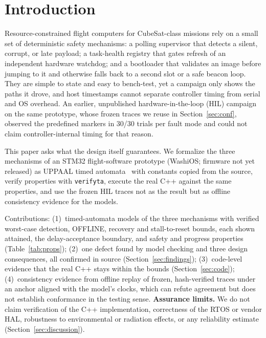 \documentclass[conference,a4paper]{IEEEtran}
\newif\ifanon
\begin{document}
\section{Introduction}
Resource-constrained flight computers for CubeSat-class missions rely on a small set of deterministic safety mechanisms: a polling supervisor that detects a silent, corrupt, or late payload; a task-health registry that gates refresh of an independent hardware watchdog; and a bootloader that validates an image before jumping to it and otherwise falls back to a second slot or a safe beacon loop. They are simple to state and easy to bench-test, yet a campaign only shows the paths it drove, and host timestamps cannot separate controller timing from serial and OS overhead. An earlier, unpublished hardware-in-the-loop (HIL) campaign on the same prototype, whose frozen traces we reuse in Section~\ref{sec:conf}, observed the predefined markers in 30/30 trials per fault mode and could not claim controller-internal timing for that reason.

This paper asks what the design itself guarantees. We formalize the three mechanisms of an STM32 flight-software prototype (\ifanon name withheld for review\else WashiOS\fi; firmware not yet released) as UPPAAL timed automata~\cite{alur1994,larsen1997,behrmann2004} with constants copied from the source, verify properties with \texttt{verifyta}, execute the real C++ against the same properties, and use the frozen HIL traces not as the result but as offline consistency evidence for the models.

Contributions: (1)~timed-automata models of the three mechanisms with verified worst-case detection, OFFLINE, recovery and stall-to-reset bounds, each shown attained, the delay-acceptance boundary, and safety and progress properties (Table~\ref{tab:props}); (2)~one defect found by model checking and three design consequences, all confirmed in source (Section~\ref{sec:findings}); (3)~code-level evidence that the real C++ stays within the bounds (Section~\ref{sec:code}); (4)~consistency evidence from offline replay of frozen, hash-verified traces under an anchor aligned with the model's clocks, which can refute agreement but does not establish conformance in the testing sense.
\textbf{Assurance limits.} We do not claim verification of the C++ implementation, correctness of the RTOS or vendor HAL, robustness to environmental or radiation effects, or any reliability estimate (Section~\ref{sec:discussion}).
\end{document}
